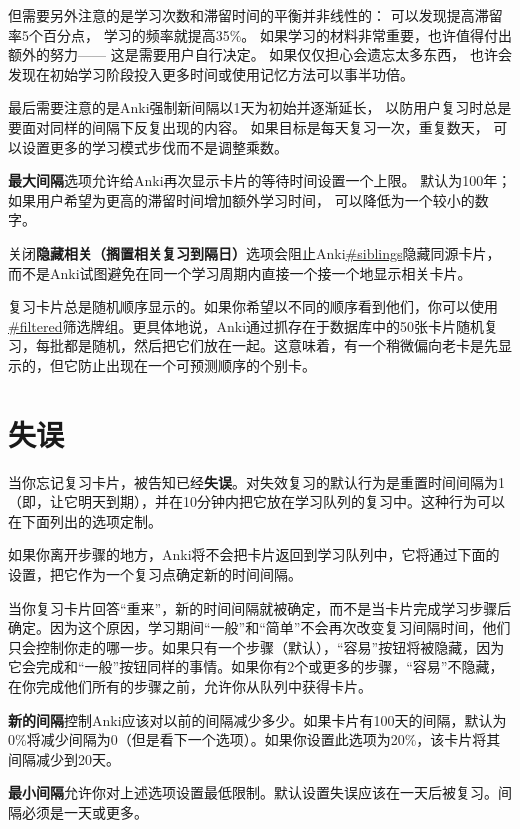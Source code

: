 \documentclass[a4paper]{book}
\begin{document}
	但需要另外注意的是学习次数和滞留时间的平衡并非线性的： 可以发现提高滞留率5个百分点， 学习的频率就提高35\%。 如果学习的材料非常重要，也许值得付出额外的努力—— 这是需要用户自行决定。 如果仅仅担心会遗忘太多东西， 也许会发现在初始学习阶段投入更多时间或使用记忆方法可以事半功倍。
	
	最后需要注意的是Anki强制新间隔以1天为初始并逐渐延长， 以防用户复习时总是要面对同样的间隔下反复出现的内容。 如果目标是每天复习一次，重复数天， 可以设置更多的学习模式步伐而不是调整乘数。
	
	\textbf{最大间隔}选项允许给Anki再次显示卡片的等待时间设置一个上限。 默认为100年；如果用户希望为更高的滞留时间增加额外学习时间， 可以降低为一个较小的数字。
	
	关闭\textbf{隐藏相关（搁置相关复习到隔日）}选项会阻止Anki\url{#siblings}隐藏同源卡片，而不是Anki试图避免在同一个学习周期内直接一个接一个地显示相关卡片。
	
	\begin{shaded}
		复习卡片总是随机顺序显示的。如果你希望以不同的顺序看到他们，你可以使用\url{#filtered}筛选牌组。更具体地说，Anki通过抓存在于数据库中的50张卡片随机复习，每批都是随机，然后把它们放在一起。这意味着，有一个稍微偏向老卡是先显示的，但它防止出现在一个可预测顺序的个别卡。
	\end{shaded}
	\section{失误}
	当你忘记复习卡片，被告知已经\textbf{失误}。对失效复习的默认行为是重置时间间隔为1（即，让它明天到期），并在10分钟内把它放在学习队列的复习中。这种行为可以在下面列出的选项定制。
	
	如果你离开步骤的地方，Anki将不会把卡片返回到学习队列中，它将通过下面的设置，把它作为一个复习点确定新的时间间隔。
	
	\begin{shaded}
		当你复习卡片回答“重来”，新的时间间隔就被确定，而不是当卡片完成学习步骤后确定。因为这个原因，学习期间“一般”和“简单”不会再次改变复习间隔时间，他们只会控制你走的哪一步。如果只有一个步骤（默认），“容易”按钮将被隐藏，因为它会完成和“一般”按钮同样的事情。如果你有2个或更多的步骤，“容易”不隐藏，在你完成他们所有的步骤之前，允许你从队列中获得卡片。
	\end{shaded}
	
	\textbf{新的间隔}控制Anki应该对以前的间隔减少多少。如果卡片有100天的间隔，默认为0\%将减少间隔为0（但是看下一个选项）。如果你设置此选项为20\%，该卡片将其间隔减少到20天。
	
	\textbf{最小间隔}允许你对上述选项设置最低限制。默认设置失误应该在一天后被复习。间隔必须是一天或更多。
	
\end{document}
